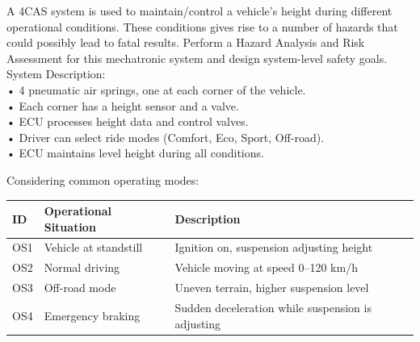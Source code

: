 



A 4CAS system is used to maintain/control a vehicle's height during different operational conditions. 
These conditions gives rise to a number of hazards that could possibly lead to fatal results. 
Perform a Hazard Analysis and Risk Assessment for this mechatronic system and design system-level 
safety goals.\\

System Description:\\
	• 4 pneumatic air springs, one at each corner of the vehicle.\\
	• Each corner has a height sensor and a valve.\\
	• ECU processes height data and control valves.\\
	• Driver can select ride modes (Comfort, Eco, Sport, Off-road).\\
    • ECU maintains level height during all conditions.\\



\begin{solutionblock}
    Considering common operating modes:

    \begin{table}[ht]
        \centering
        \begin{tabular}{ | m{5em} | m{4cm}| m{8cm} | }
            \hline
            ID & Operational Situation & Description \\
            \hline \hline
            OS1 & Vehicle at standstill & Ignition on, suspension adjusting height\\
            \hline
            OS2 & Normal driving & Vehicle moving at speed 0–120 km/h\\
            \hline
            OS3 & Off-road mode & Uneven terrain, higher suspension level\\
            \hline
            OS4 & Emergency braking & Sudden deceleration while suspension is adjusting\\
            \hline
        \end{tabular}
    \end{table}
\end{solutionblock}


